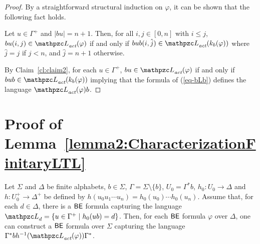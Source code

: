 \begin{proof}
By a straightforward structural induction on $\varphi$, it can be shown that the following fact holds.

\begin{claim}\label{cl:claim2} Let $u\in \Gamma^{+}$ and $|bu|= n+1$. Then, for all $i,j \in [0,n]$ with $i\leq j$, $bu(i,j) \in \Lang_\act(\varphi)$
if and only if $bub(i,\hat{j})\in \Lang_\act(k_b(\varphi))$ where  $\hat{j}= j$ if $j<n$, and $\hat{j}=n+1$ otherwise.
\end{claim}

 By Claim~\ref{cl:claim2}, for each $u\in \Gamma^{+}$, $bu\in \Lang_\act(\varphi)$ if and only if $bub\in \Lang_\act(k_b(\varphi))$ implying that the formula of (\ref{eq-bLb})
 defines the language $\Lang_\act(\varphi)b$. 
%
\end{proof}
  
  
\section{Proof of Lemma~\ref{lemma2:CharacterizationFinitaryLTL}}\label{proof:lemma2:CharacterizationFinitaryLTL}

\begin{lemma*}[\ref{lemma2:CharacterizationFinitaryLTL}] Let $\Sigma$ and $\Delta$ be finite alphabets,
  $b\in \Sigma$, $\Gamma=\Sigma\setminus\{b\}$, $U_0= \Gamma^{*}b$, $h_0:U_0 \rightarrow \Delta$ and $h:U_0^{+} \rightarrow \Delta^{+}$ be defined by
    $h(u_0u_1\cdots u_n)=h_0(u_0)\cdots h_0(u_n)$. Assume that, for each $d\in \Delta$, there is a $\mathsf{BE}$ formula capturing the language $\Lang_d =\{u\in \Gamma^{+}\mid h_0(ub)= d\}$.  Then, for each $\mathsf{BE}$ formula $\varphi$ over $\Delta$, one can construct a $\mathsf{BE}$ formula over $\Sigma$
    capturing
    the language $\Gamma^{*}b h^{-1}(\Lang_\act(\varphi))\Gamma^{*}$.
  \end{lemma*}
  
